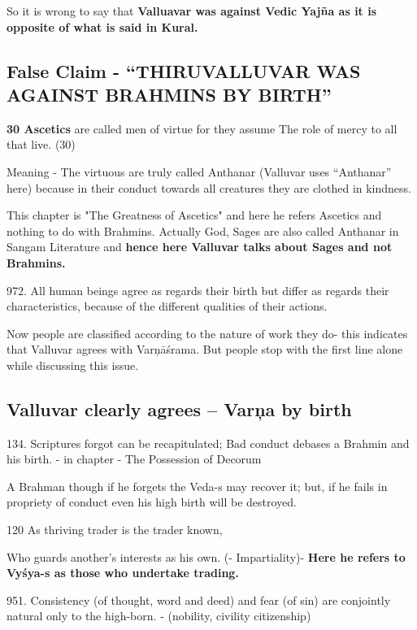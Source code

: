 So it is wrong to say that \textbf{Valluavar was against Vedic Yajña as it is opposite of what is said in Kural.}


\subsection*{False Claim - “THIRUVALLUVAR WAS AGAINST BRAHMINS BY BIRTH”}

\endnote{}\textbf{30 Ascetics} are called men of virtue for they assume The role of mercy to all that live. (30)

Meaning - The virtuous are truly called Anthanar (Valluvar uses “Anthanar” here) because in their conduct towards all creatures they are clothed in kindness.

This chapter is "The Greatness of Ascetics" and here he refers Ascetics and nothing to do with Brahmins. Actually God, Sages are also called Anthanar in Sangam Literature and \textbf{hence here Valluvar talks about Sages and not Brahmins.}

 972. All human beings agree as regards their birth but differ as regards their characteristics, because of the different qualities of their actions.\endnote{}

Now people are classified according to the nature of work they do- this indicates that Valluvar agrees with Varņāśrama\endnote{}. But people stop with the first line alone while discussing this issue.


\subsection*{Valluvar clearly agrees – Varņa by birth}

134. Scriptures forgot can be recapitulated; Bad conduct debases a Brahmin and his birth.\endnote{} - in chapter - The Possession of Decorum

A Brahman though if he forgets the Veda-s may recover it; but, if he fails in propriety of conduct even his high birth will be destroyed.

120 As thriving trader is the trader known,\endnote{}

\newpage

Who guards another's interests as his own. (- Impartiality)- \textbf{Here he refers to Vyśya-s as those who undertake trading.}

951.\endnote{} Consistency (of thought, word and deed) and fear (of sin) are conjointly natural only to the high-born. -  (nobility, civility citizenship)

